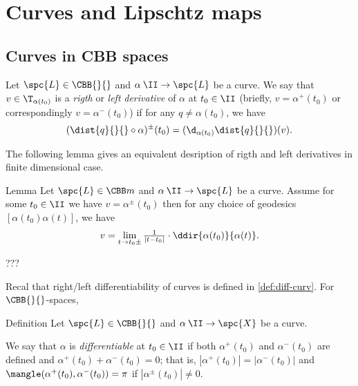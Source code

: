 \chapter{Curves and Lipschtz maps}


\section{Curves in CBB spaces}

Let
$\spc{L}\in\CBB{}{}$ 
and $\alpha\:\II\to \spc{L}$ be a curve.
We say that $v\in\T_{\alpha(t_0)}$ is a \emph{rigth} or \emph{left} \emph{derivative} of $\alpha$ at $t_0\in\II$ (briefly, $v=\alpha^+(t_0)$ or correspondingly $v=\alpha^-(t_0)$)
if 
for any $q\not=\alpha(t_0)$, we have
\[(\dist{q}{}{}\circ\alpha)^\pm(t_0)=(\d_{\alpha(t_0)}\dist{q}{}{})(v).\]



The following lemma gives an equivalent desription of rigth and left derivatives in finite dimensional case.


\begin{thm}{Lemma}
Let $\spc{L}\in\CBB m{}$ and $\alpha\:\II\to \spc{L}$ be a curve.
Assume for some $t_0\in \II$ we have $v=\alpha^\pm(t_0)$ then 
for any choice of geodesics $[\alpha(t_0)\alpha(t)]$, we have
\[v=\lim_{t\to t_0\pm}\tfrac{1}{|t-t_0|}\cdot\ddir{\alpha(t_0)}{\alpha(t)}.\]

\end{thm}

???
\qeds

Recal that right/left differentiability of curves is defined in \ref{def:diff-curv}.
For $\CBB{}{}$-spaces, 

\begin{thm}{Definition}\label{def:diff-curv-yet}
Let
$\spc{L}\in \CBB{}{}$  
and $\alpha\:\II\to \spc{X}$ be a curve.

We say that $\alpha$ is \emph{differentiable} at $t_0\in\II$ if 
both $\alpha^+(t_0)$ and $\alpha^-(t_0)$ are defined and $\alpha^+(t_0)+\alpha^-(t_0)=0$; that is,  $|\alpha^+(t_0)|=|\alpha^-(t_0)|$ and 
$\mangle(\alpha^+(t_0),\alpha^-(t_0))=\pi$ if $|\alpha^\pm(t_0)|\ne 0$.
\end{thm}





